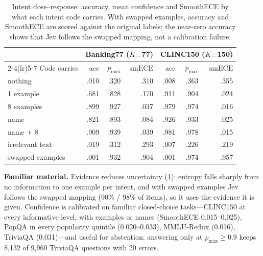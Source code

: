 \documentclass[10pt,twocolumn]{article}
\newcommand{\pmax}{p_{\max}}
\newcommand{\sece}{\mathrm{smECE}}
\begin{document}
\begin{table}[t]
\centering
\small
\setlength{\tabcolsep}{3.5pt}
\caption{Intent dose--response: accuracy, mean confidence and SmoothECE by
what each intent code carries. With swapped examples, accuracy and SmoothECE
are scored against the original labels; the near-zero accuracy shows that Jev
follows the swapped mapping, not a calibration failure.}
\label{tab:intent}
\begin{tabular}{@{}l rrr rrr@{}}
\toprule
& \multicolumn{3}{c}{Banking77 ($K$=77)} & \multicolumn{3}{c}{CLINC150 ($K$=150)} \\
\cmidrule(lr){2-4}\cmidrule(lr){5-7}
Code carries & acc & $\pmax$ & $\sece$ & acc & $\pmax$ & $\sece$ \\
\midrule
nothing & .010 & .320 & .310 & .008 & .363 & .355 \\
1 example & .681 & .828 & .170 & .911 & .904 & .024 \\
8 examples & .899 & .927 & .037 & .979 & .974 & .016 \\
name & .821 & .893 & .084 & .926 & .933 & .025 \\
name + 8 & .909 & .939 & .039 & .981 & .978 & .015 \\
irrelevant text & .019 & .312 & .293 & .007 & .226 & .219 \\
swapped examples & .001 & .932 & .904 & .001 & .974 & .957 \\
\bottomrule
\end{tabular}
\end{table}

\textbf{Familiar material.} Evidence reduces uncertainty
(\cref{tab:intent}): entropy falls sharply from no information to one example
per intent, and with swapped examples Jev follows the swapped mapping (90\% /
98\% of items), so it uses the evidence it is given. Confidence is calibrated
on familiar closed-choice tasks---CLINC150 at every informative level, with
examples or names (SmoothECE 0.015--0.025), PopQA in every popularity
quintile (0.020--0.033), MMLU-Redux (0.016), TriviaQA (0.031)---and useful for
abstention: answering only at $\pmax\ge0.9$ keeps 8{,}132 of 9{,}960 TriviaQA
questions with 20 errors.
\end{document}
